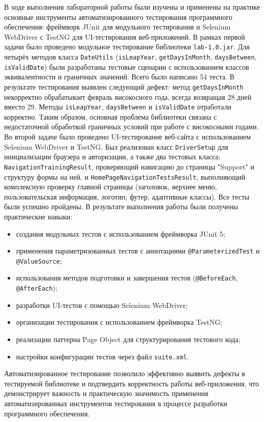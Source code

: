 \documentclass{article}[14pt]
\begin{document}
В ходе выполнения лабораторной работы были изучены и применены на практике основные инструменты автоматизированного тестирования программного обеспечения: фреймворк JUnit для модульного тестирования и Selenium WebDriver с TestNG для UI-тестирования веб-приложений.
В рамках первой задачи было проведено модульное тестирование библиотеки \texttt{lab-1.0.jar}. Для четырёх методов класса \texttt{DateUtils} (\texttt{isLeapYear}, \texttt{getDaysInMonth}, \texttt{daysBetween}, \texttt{isValidDate}) были разработаны тестовые сценарии с использованием классов эквивалентности и граничных значений. Всего было написано 54 теста. В результате тестирования выявлен следующий дефект: метод \texttt{getDaysInMonth} некорректно обрабатывает февраль високосного года, всегда возвращая 28 дней вместо 29. Методы \texttt{isLeapYear}, \texttt{daysBetween} и \texttt{isValidDate} отработали корректно. Таким образом, основная проблема библиотеки связана с недостаточной обработкой граничных условий при работе с високосными годами.
Во второй задаче было проведено UI-тестирование веб-сайта с использованием Selenium WebDriver и TestNG. Был реализован класс \texttt{DriverSetup} для инициализации браузера и авторизации, а также два тестовых класса: \texttt{NavigationTrainingResult}, проверяющий навигацию до страницы "Support" и структуру формы на ней, и \texttt{HomePageNavigationTestsResult}, выполняющий комплексную проверку главной страницы (заголовок, верхнее меню, пользовательская информация, логотип, футер, адаптивные классы). Все тесты были успешно пройдены.
В результате выполнения работы были получены практические навыки:
\begin{itemize}
\item создания модульных тестов с использованием фреймворка JUnit 5;
\item применения параметризованных тестов с аннотациями \texttt{@ParameterizedTest} и \texttt{@ValueSource};
\item использования методов подготовки и завершения тестов (\texttt{@BeforeEach}, \texttt{@AfterEach});
\item разработки UI-тестов с помощью Selenium WebDriver;
\item организации тестирования с использованием фреймворка TestNG;
\item реализации паттерна Page Object для структурирования тестового кода;
\item настройки конфигурации тестов через файл \texttt{suite.xml}.
\end{itemize}
Автоматизированное тестирование позволило эффективно выявить дефекты в тестируемой библиотеке и подтвердить корректность работы веб-приложения, что демонстрирует важность и практическую значимость применения автоматизированных инструментов тестирования в процессе разработки программного обеспечения.
\end{document}
